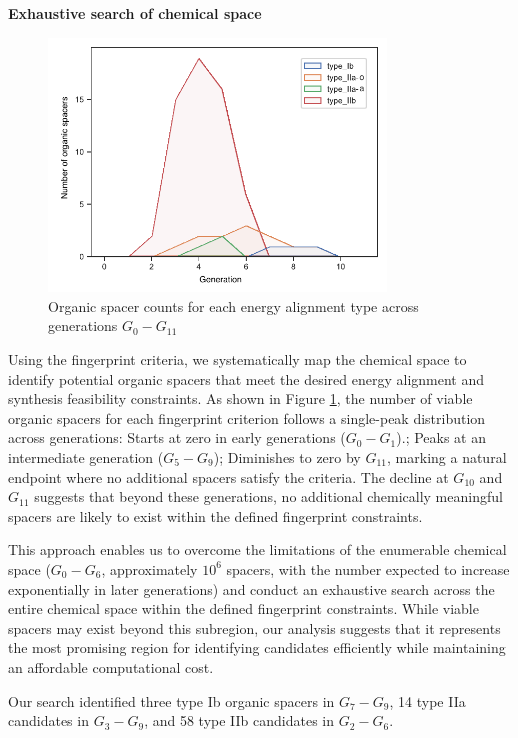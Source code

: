 \textbf{Exhaustive search of chemical space}

\begin{figure}[htbp]
    \centering
    \includegraphics[width=0.8\textwidth]{figures/synthesis-feasibility/figure5-13.pdf}
    \caption{Organic spacer counts for each energy alignment type across generations $G_0-G_{11}$}
    \label{fig:figure5.13}
\end{figure}

Using the fingerprint criteria, we systematically map the chemical space to identify potential organic spacers that meet the desired energy alignment and synthesis feasibility constraints. As shown in Figure \ref{fig:figure5.13}, the number of viable organic spacers for each fingerprint criterion follows a single-peak distribution across generations: Starts at zero in early generations ($G_0-G_1$).; Peaks at an intermediate generation ($G_5-G_9$); Diminishes to zero by $G_{11}$, marking a natural endpoint where no additional spacers satisfy the criteria.
The decline at $G_{10}$ and $G_{11}$ suggests that beyond these generations, no additional chemically meaningful spacers are likely to exist within the defined fingerprint constraints.

This approach enables us to overcome the limitations of the enumerable chemical space ($G_0-G_6$, approximately $10^6$ spacers, with the number expected to increase exponentially in later generations) and conduct an exhaustive search across the entire chemical space within the defined fingerprint constraints. While viable spacers may exist beyond this subregion, our analysis suggests that it represents the most promising region for identifying candidates efficiently while maintaining an affordable computational cost. 

Our search identified three type Ib organic spacers in $G_7-G_9$, 14 type IIa candidates in $G_3-G_9$, and 58 type IIb candidates in $G_2-G_6$. 

